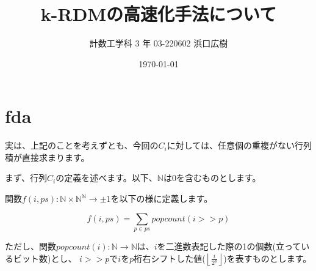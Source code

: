\documentclass[a4paper, 10pt, dvipdfmx]{jlreq}
\begin{document}
\title{k-RDMの高速化手法について}
\author{計数工学科 3 年 03-220602 浜口広樹}
\date{\today}
\maketitle

\section*{fda}

実は、上記のことを考えずとも、今回の$C_i$に対しては、任意個の重複がない行列積が直接求まります。

まず、行列$C_i$の定義を述べます。以下、$\mathbb{N}$は$0$を含むものとします。

関数$f(i,ps) : \mathbb{N} \times \mathbb{N}^\mathbb{N} \to \pm 1$を以下の様に定義します。

$$
    f(i,ps)=\sum_{p \in ps}{popcount\left(i>>p\right)}
$$

ただし、関数$popcount(i): \mathbb{N} \to \mathbb{N}$は、$i$を二進数表記した際の1の個数(立っているビット数)とし、
$i>>p$で$i$を$p$桁右シフトした値($\left\lfloor\frac{i}{2^p}\right\rfloor$)を表すものとします。
\end{document}

